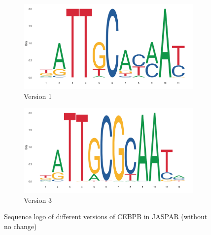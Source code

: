 \documentclass{PHlab-thesis}
\begin{document}
\begin{figure}[htbp]
	\centering
	\begin{subfigure}[b]{0.45\textwidth}
		\includegraphics[width=\textwidth]{figures/v1.png}
		\caption{Version 1}
		\label{fig:CEBPBv1} 
	\end{subfigure}
	\begin{subfigure}[b]{0.45\textwidth}
		\ContinuedFloat
		\includegraphics[width=\textwidth]{figures/v3.png}
		\caption{Version 3}
	\end{subfigure}
	\caption{Sequence logo of different versions of CEBPB in JASPAR (without no change)}
	\label{fig:CEBPBv1v3} 
\end{figure}
\end{document}

